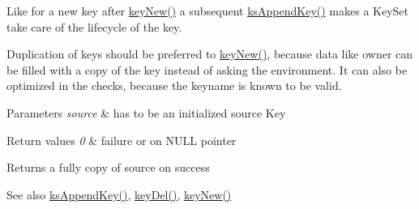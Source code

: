 Like for a new key after \mbox{\hyperlink{group__key_gad23c65b44bf48d773759e1f9a4d43b89}{key\+New()}} a subsequent \mbox{\hyperlink{group__keyset_gaa5a1d467a4d71041edce68ea7748ce45}{ks\+Append\+Key()}} makes a Key\+Set take care of the lifecycle of the key.


\begin{DoxyCode}{0}
\DoxyCodeLine{\{}
\DoxyCodeLine{        \textcolor{comment}{// work with duplicate}}
\DoxyCodeLine{        \textcolor{comment}{// ksDel(ks) will also free the duplicate}}
\DoxyCodeLine{        \textcolor{comment}{// source remains unchanged.}}
\DoxyCodeLine{\}}
\end{DoxyCode}


Duplication of keys should be preferred to \mbox{\hyperlink{group__key_gad23c65b44bf48d773759e1f9a4d43b89}{key\+New()}}, because data like owner can be filled with a copy of the key instead of asking the environment. It can also be optimized in the checks, because the keyname is known to be valid.


\begin{DoxyParams}{Parameters}
{\em source} & has to be an initialized source Key \\
\hline
\end{DoxyParams}

\begin{DoxyRetVals}{Return values}
{\em 0} & failure or on N\+U\+LL pointer \\
\hline
\end{DoxyRetVals}
\begin{DoxyReturn}{Returns}
a fully copy of source on success 
\end{DoxyReturn}
\begin{DoxySeeAlso}{See also}
\mbox{\hyperlink{group__keyset_gaa5a1d467a4d71041edce68ea7748ce45}{ks\+Append\+Key()}}, \mbox{\hyperlink{group__key_ga3df95bbc2494e3e6703ece5639be5bb1}{key\+Del()}}, \mbox{\hyperlink{group__key_gad23c65b44bf48d773759e1f9a4d43b89}{key\+New()}} 
\end{DoxySeeAlso}
\mbox{\label{group__key_ga4aabc4272506dd63161db2bbb42de8ae}} 
